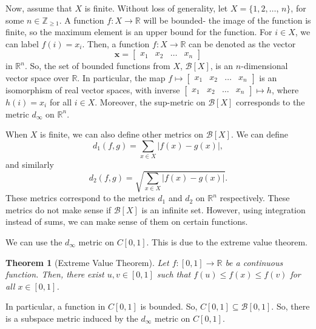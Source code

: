\documentclass[a4paper, openany]{memoir}
\theoremstyle{definition}
\theoremstyle{plain}
\newtheorem{theorem}[definition]{Theorem}
\begin{document}
Now, assume that $X$ is finite. Without loss of generality, let $X = \{1, 2, \dots$, $n\}$, for some $n \in \mathbb{Z}_{\geqslant 1}$. A function $f: X \to \mathbb{R}$ will be bounded- the image of the function is finite, so the maximum element is an upper bound for the function. For $i \in X$, we can label $f(i) = x_i$. Then, a function $f: X \to \mathbb{R}$ can be denoted as the vector
\[\bm{x} = \begin{bmatrix}
x_1 & x_2 & \dots & x_n
\end{bmatrix}\]
in $\mathbb{R}^n$. So, the set of bounded functions from $X$, $\mathcal{B}[X]$, is an $n$-dimensional vector space over $\mathbb{R}$. In particular, the map $f \mapsto \begin{bmatrix}
x_1 & x_2 & \dots & x_n
\end{bmatrix}$ is an isomorphism of real vector spaces, with inverse $\begin{bmatrix}
x_1 & x_2 & \dots & x_n
\end{bmatrix} \mapsto h$, where $h(i) = x_i$ for all $i \in X$. Moreover, the sup-metric on $\mathcal{B}[X]$ corresponds to the metric $d_\infty$ on $\mathbb{R}^n$.

When $X$ is finite, we can also define other metrics on $\mathcal{B}[X]$. We can define
\[d_1(f, g) = \sum_{x \in X} |f(x) - g(x)|,\]
and similarly
\[d_2 (f, g) = \sqrt{\sum_{x \in X} |f(x) - g(x)|}.\]
These metrics correspond to the metrics $d_1$ and $d_2$ on $\mathbb{R}^n$ respectively. These metrics do not make sense if $\mathcal{B}[X]$ is an infinite set. However, using integration instead of sums, we can make sense of them on certain functions.

We can use the $d_\infty$ metric on $C[0, 1]$. This is due to the extreme value theorem.
\begin{theorem}[Extreme Value Theorem]
Let $f: [0, 1] \to \mathbb{R}$ be a continuous function. Then, there exist $u, v \in [0, 1]$ such that $f(u) \leqslant f(x) \leqslant f(v)$ for all $x \in [0, 1]$.
\end{theorem}
\noindent In particular, a function in $C[0, 1]$ is bounded. So, $C[0, 1] \subseteq \mathcal{B}[0, 1]$. So, there is a subspace metric induced by the $d_\infty$ metric on $C[0, 1]$.
\end{document}
